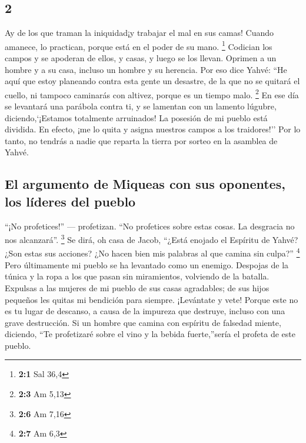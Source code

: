 \begin{paracol}{2}
\hypertarget{section-2}{%
\section{2}\label{section-2}}

 Ay de los que traman la iniquidad¡y trabajar el mal en
sus camas! Cuando amanece, lo practican, porque está en el poder de su
mano. \footnote{\textbf{2:1} Sal 36,4}  Codician los
campos y se apoderan de ellos, y casas, y luego se los llevan. Oprimen a
un hombre y a su casa, incluso un hombre y su herencia. 
Por eso dice Yahvé: ``He aquí que estoy planeando contra esta gente un
desastre, de la que no se quitará el cuello, ni tampoco caminarás con
altivez, porque es un tiempo malo. \footnote{\textbf{2:3} Am 5,13}
 En ese día se levantará una parábola contra ti, y se
lamentan con un lamento lúgubre, diciendo,`¡Estamos totalmente
arruinados! La posesión de mi pueblo está dividida. En efecto, ¡me lo
quita y asigna nuestros campos a los traidores!''  Por lo
tanto, no tendrás a nadie que reparta la tierra por sorteo en la
asamblea de Yahvé.

\hypertarget{el-argumento-de-miqueas-con-sus-oponentes-los-luxedderes-del-pueblo}{%
\subsection{El argumento de Miqueas con sus oponentes, los líderes del
pueblo}\label{el-argumento-de-miqueas-con-sus-oponentes-los-luxedderes-del-pueblo}}

 ``¡No profetices!'' --- profetizan. ``No profetices sobre
estas cosas. La desgracia no nos alcanzará''. \footnote{\textbf{2:6} Am
  7,16}  Se dirá, oh casa de Jacob, ``¿Está enojado el
Espíritu de Yahvé? ¿Son estas sus acciones? ¿No hacen bien mis palabras
al que camina sin culpa?'' \footnote{\textbf{2:7} Am 6,3} 
Pero últimamente mi pueblo se ha levantado como un enemigo. Despojas de
la túnica y la ropa a los que pasan sin miramientos, volviendo de la
batalla.  Expulsas a las mujeres de mi pueblo de sus casas
agradables; de sus hijos pequeños les quitas mi bendición para siempre.
 ¡Levántate y vete! Porque este no es tu lugar de
descanso, a causa de la impureza que destruye, incluso con una grave
destrucción.  Si un hombre que camina con espíritu de
falsedad miente, diciendo, ``Te profetizaré sobre el vino y la bebida
fuerte,''sería el profeta de este pueblo.


\end{paracol}

